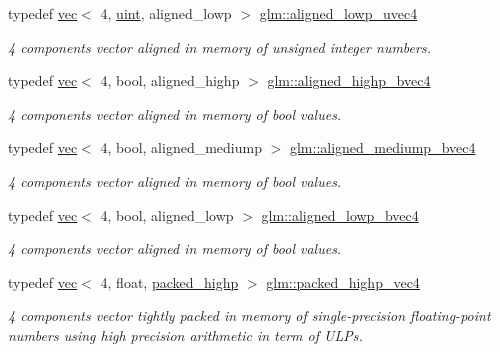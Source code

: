 \begin{DoxyCompactItemize}
typedef \mbox{\hyperlink{structglm_1_1vec}{vec}}$<$ 4, \mbox{\hyperlink{group__core__precision_ga4fd29415871152bfb5abd588334147c8}{uint}}, aligned\+\_\+lowp $>$ \mbox{\hyperlink{group__gtc__type__aligned_ga4d1ee133cfc4f795052958ffab70d746}{glm\+::aligned\+\_\+lowp\+\_\+uvec4}}
\begin{DoxyCompactList}\small\item\em 4 components vector aligned in memory of unsigned integer numbers. \end{DoxyCompactList}\item 
typedef \mbox{\hyperlink{structglm_1_1vec}{vec}}$<$ 4, bool, aligned\+\_\+highp $>$ \mbox{\hyperlink{group__gtc__type__aligned_ga833e4cd7402677f8ca56795a12d8bec0}{glm\+::aligned\+\_\+highp\+\_\+bvec4}}
\begin{DoxyCompactList}\small\item\em 4 components vector aligned in memory of bool values. \end{DoxyCompactList}\item 
typedef \mbox{\hyperlink{structglm_1_1vec}{vec}}$<$ 4, bool, aligned\+\_\+mediump $>$ \mbox{\hyperlink{group__gtc__type__aligned_gaa5fba8713e0381efe85996169fbc2bcc}{glm\+::aligned\+\_\+mediump\+\_\+bvec4}}
\begin{DoxyCompactList}\small\item\em 4 components vector aligned in memory of bool values. \end{DoxyCompactList}\item 
typedef \mbox{\hyperlink{structglm_1_1vec}{vec}}$<$ 4, bool, aligned\+\_\+lowp $>$ \mbox{\hyperlink{group__gtc__type__aligned_ga7584318e96ebbf1e7649a7af7724ecca}{glm\+::aligned\+\_\+lowp\+\_\+bvec4}}
\begin{DoxyCompactList}\small\item\em 4 components vector aligned in memory of bool values. \end{DoxyCompactList}\item 
typedef \mbox{\hyperlink{structglm_1_1vec}{vec}}$<$ 4, float, \mbox{\hyperlink{namespaceglm_a36ed105b07c7746804d7fdc7cc90ff25a8e8791ee77fe079b1291f710d88031bf}{packed\+\_\+highp}} $>$ \mbox{\hyperlink{group__gtc__type__aligned_gabbc42b2b5ad854c60821526c4e291161}{glm\+::packed\+\_\+highp\+\_\+vec4}}
\begin{DoxyCompactList}\small\item\em 4 components vector tightly packed in memory of single-\/precision floating-\/point numbers using high precision arithmetic in term of U\+L\+Ps. \end{DoxyCompactList}\item 

\end{DoxyCompactItemize}
